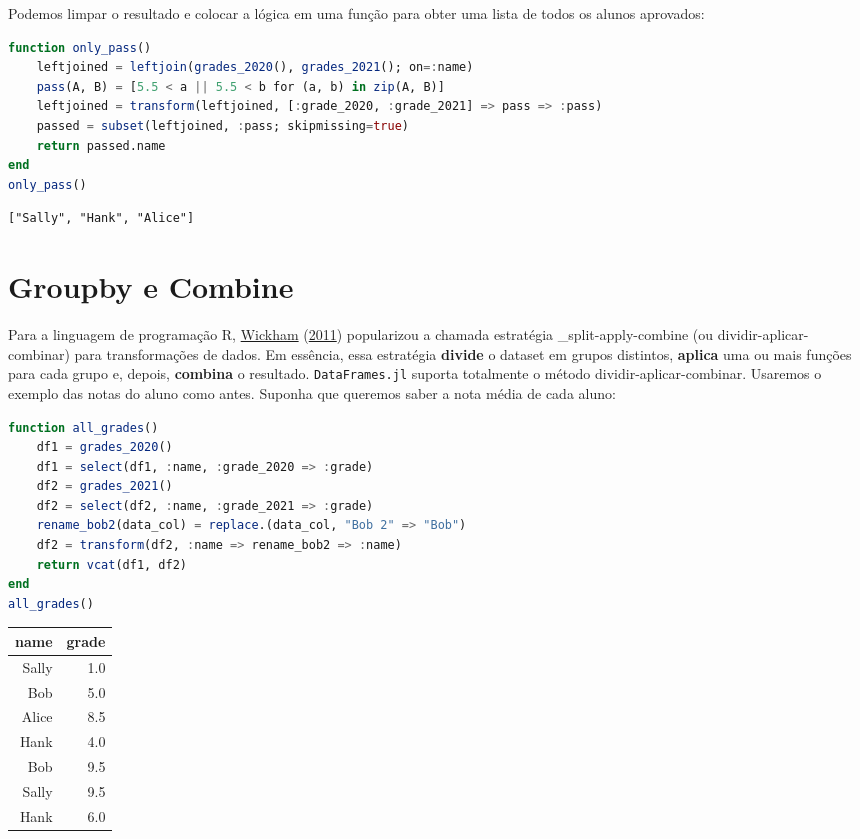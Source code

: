 \documentclass[
  notoc %
]{tufte-book}
\newcommand{\passthrough}[1]{#1}
\begin{document}
Podemos limpar o resultado e colocar a lógica em uma função para obter
uma lista de todos os alunos aprovados:

\begin{lstlisting}[language=Julia]
function only_pass()
    leftjoined = leftjoin(grades_2020(), grades_2021(); on=:name)
    pass(A, B) = [5.5 < a || 5.5 < b for (a, b) in zip(A, B)]
    leftjoined = transform(leftjoined, [:grade_2020, :grade_2021] => pass => :pass)
    passed = subset(leftjoined, :pass; skipmissing=true)
    return passed.name
end
only_pass()
\end{lstlisting}

\begin{lstlisting}[language=Output]
["Sally", "Hank", "Alice"]
\end{lstlisting}

\hypertarget{sec:groupby_combine}{%
\section{Groupby e Combine}\label{sec:groupby_combine}}

Para a linguagem de programação R,
\protect\hyperlink{ref-wickham2011split}{Wickham}
(\protect\hyperlink{ref-wickham2011split}{2011}) popularizou a chamada
estratégia \_split-apply-combine (ou dividir-aplicar-combinar) para
transformações de dados. Em essência, essa estratégia \textbf{divide} o
dataset em grupos distintos, \textbf{aplica} uma ou mais funções para
cada grupo e, depois, \textbf{combina} o resultado.
\passthrough{\lstinline!DataFrames.jl!} suporta totalmente o método
dividir-aplicar-combinar. Usaremos o exemplo das notas do aluno como
antes. Suponha que queremos saber a nota média de cada aluno:

\begin{lstlisting}[language=Julia]
function all_grades()
    df1 = grades_2020()
    df1 = select(df1, :name, :grade_2020 => :grade)
    df2 = grades_2021()
    df2 = select(df2, :name, :grade_2021 => :grade)
    rename_bob2(data_col) = replace.(data_col, "Bob 2" => "Bob")
    df2 = transform(df2, :name => rename_bob2 => :name)
    return vcat(df1, df2)
end
all_grades()
\end{lstlisting}

\begin{longtable}[]{@{}rr@{}}
\toprule
name & grade \\
\midrule
\endhead
Sally & 1.0 \\
Bob & 5.0 \\
Alice & 8.5 \\
Hank & 4.0 \\
Bob & 9.5 \\
Sally & 9.5 \\
Hank & 6.0 \\
\bottomrule
\end{longtable}
\end{document}
